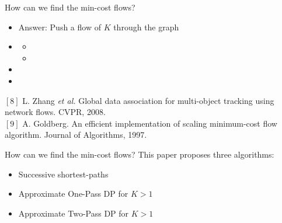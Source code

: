 \documentclass[aspectratio=43]{beamer}
\begin{document}
		
		\begin{frame}{How can we find the min-cost flows?}
			\begin{itemize}
				\item Answer: Push a flow of $K$ through the graph
				\item {}
				\begin{itemize}
					\item {}
					\item {}
				\end{itemize}
				\item {}
				\item {}
			\end{itemize}
			\vfill
			{\fontsize{4}{12} \selectfont
				$[8]$ L. Zhang \textit{et al.} Global data association for multi-object tracking using network flows. CVPR, 2008.  \\ \vspace{-2mm}
				$[9]$ A. Goldberg. An efficient implementation of scaling minimum-cost flow algorithm. Journal of Algorithms, 1997.
			}
			\smallskip
		\end{frame}
		
		
		\begin{frame}{How can we find the min-cost flows?}
			This paper proposes three algorithms:
			\begin{itemize}
				\item Successive shortest-paths
				\item Approximate One-Pass DP for $K>1$
				\item Approximate Two-Pass DP for $K>1$
			\end{itemize}
		\end{frame}
		
\end{document}
